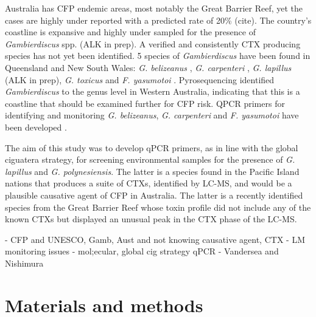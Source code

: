 \documentclass[12pt]{article}
\begin{document}
Australia has CFP endemic areas, most notably the Great Barrier Reef, yet the cases are highly under reported with a predicted rate of 20\% (cite). The country's coastline is expansive and highly under sampled for the presence of \emph{Gambierdiscus} spp. (ALK in prep). A verified and consistently CTX producing species has not yet been identified. 5 species of \emph{Gambierdiscus} have been found in Queensland and New South Wales:  \emph{G. belizeanus}  \citep{murray2014molecular}, \emph{G. carpenteri} \citep{kohli2014high}, \emph{G. lapillus} (ALK in prep), \emph{G. toxicus} \citep{hallegraeff2010algae} and \emph{F. yasumotoi}  \citep{murray2014molecular}. Pyrosequencing identified \emph{Gambierdiscus} to the genus level in Western Australia, indicating that this is a coastline that should be examined further for CFP risk. 
QPCR primers for identifying and monitoring \emph{G. belizeanus}, \emph{G. carpenteri} and \emph{F. yasumotoi} have been developed \cite{nishimura2016quantitative,vandersea2012development}.

The aim of this study was to develop qPCR primers, as in line with the global ciguatera strategy, for screening environmental samples for the presence of \emph{G. lapillus} and \emph{G. polynesiensis}. The latter is a species found in the Pacific Island nations that produces a suite of CTXs, identified by LC-MS, and would be a plausible causative agent of CFP in Australia. The latter is a recently identified species from the Great Barrier Reef whose toxin profile did not include any of the known CTXs but displayed an unusual peak in the CTX phase of the LC-MS. 


- CFP and UNESCO, Gamb, Aust and not knowing causative agent, CTX
- LM monitoring issues - mol;ecular, global cig strategy qPCR
- Vandersea and Nishimura



\newpage
\section{Materials and methods}
\end{document}
